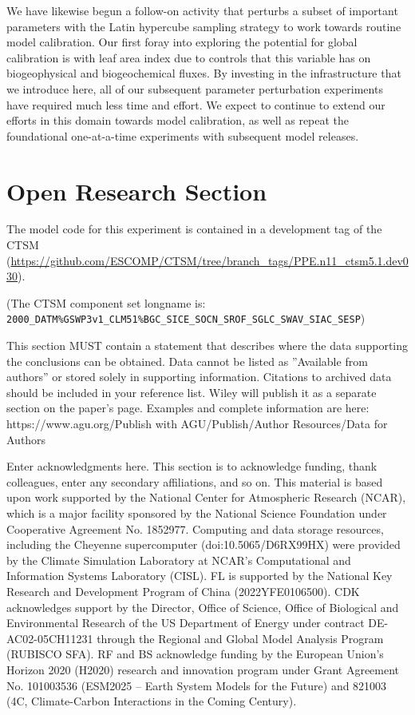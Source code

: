 \documentclass[draft]{agujournal2019}
\begin{document}
We have likewise begun a follow-on activity that perturbs a subset of important parameters with the Latin hypercube sampling strategy \cite{mckay2000} to work towards routine model calibration.  Our first foray into exploring the potential for global calibration is with leaf area index due to controls that this variable has on biogeophysical and biogeochemical fluxes. By investing in the infrastructure that we introduce here, all of our subsequent parameter perturbation experiments have required much less time and effort. We expect to continue to extend our efforts in this domain towards model calibration, as well as repeat the foundational one-at-a-time experiments with subsequent model releases.

\section*{Open Research Section}

The model code for this experiment is contained in a development tag of the CTSM (\url{https://github.com/ESCOMP/CTSM/tree/branch_tags/PPE.n11_ctsm5.1.dev030}).

 (The CTSM component set longname is: \\ \texttt{2000\_DATM\%GSWP3v1\_CLM51\%BGC\_SICE\_SOCN\_SROF\_SGLC\_SWAV\_SIAC\_SESP})

This section MUST contain a statement that describes where the data supporting the conclusions can be obtained. Data cannot be listed as ''Available from authors'' or stored solely in supporting information. Citations to archived data should be included in your reference list. Wiley will publish it as a separate section on the paper’s page. Examples and complete information are here:
https://www.agu.org/Publish with AGU/Publish/Author Resources/Data for Authors


\acknowledgments
Enter acknowledgments here. This section is to acknowledge funding, thank colleagues, enter any secondary affiliations, and so on. This material is based upon work supported by the National Center for Atmospheric Research (NCAR), which is a major facility sponsored by the National Science Foundation under Cooperative Agreement No. 1852977. Computing and data storage resources, including the Cheyenne supercomputer (doi:10.5065/D6RX99HX) were provided by the Climate Simulation Laboratory at NCAR’s Computational and Information Systems Laboratory (CISL). FL is supported by the National Key Research and Development Program of China (2022YFE0106500). CDK acknowledges support by the Director, Office of Science, Office of Biological and Environmental Research of the US Department of Energy under contract DE-AC02-05CH11231 through the Regional and Global Model Analysis Program (RUBISCO SFA). RF and BS acknowledge funding by the European Union’s Horizon 2020 (H2020) research and innovation program under Grant Agreement No. 101003536 (ESM2025 – Earth System Models for the Future) and 821003 (4C, Climate-Carbon Interactions in the Coming Century).
\end{document}
